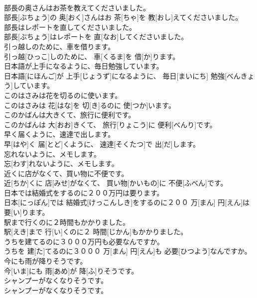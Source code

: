 \documentclass[8pt]{extreport}
\begin{document}
\begin{CJK}{UTF8}{min}
\\	部長の奥さんはお茶を教えてくださいました。	
\\	部長[ぶちょう]の 奥[おく]さんはお 茶[ちゃ]を 教[おし]えてくださいました。	
\\	部長はレポートを直してくださいました。	
\\	部長[ぶちょう]はレポートを 直[なお]してくださいました。	
\\	引っ越しのために、車を借ります。	
\\	引っ越[ひっこ]しのために、 車[くるま]を 借[か]ります。	
\\	日本語が上手になるように、毎日勉強しています。	
\\	日本語[にほんご]が 上手[じょうず]になるように、 毎日[まいにち] 勉強[べんきょう]しています。	
\\	このはさみは花を切るのに使います。	
\\	このはさみは 花[はな]を 切[き]るのに 使[つか]います。	
\\	このかばんは大きくて、旅行に便利です。	
\\	このかばんは 大[おお]きくて、 旅行[りょこう]に 便利[べんり]です。	
\\	早く届くように、速達で出します。	
\\	早[はや]く 届[とど]くように、 速達[そくたつ]で 出[だ]します。	
\\	忘れないように、メモします。	
\\	忘[わす]れないように、メモします。	
\\	近くに店がなくて、買い物に不便です。	
\\	近[ちか]くに 店[みせ]がなくて、 買い物[かいもの]に 不便[ふべん]です。	
\\	日本では結婚式をするのに２００万円は要ります。	
\\	日本[にっぽん]では 結婚式[けっこんしき]をするのに２００ 万[まん] 円[えん]は 要[い]ります。	
\\	駅まで行くのに２時間もかかりました。	
\\	駅[えき]まで 行[い]くのに２ 時間[じかん]もかかりました。	
\\	うちを建てるのに３０００万円も必要なんですか。	
\\	うちを 建[た]てるのに３０００ 万[まん] 円[えん]も 必要[ひつよう]なんですか。	
\\	今にも雨が降りそうです。	
\\	今[いま]にも 雨[あめ]が 降[ふ]りそうです。	
\\	シャンプーがなくなりそうです。	
\\	シャンプーがなくなりそうです。	

\end{CJK}
\end{document}
